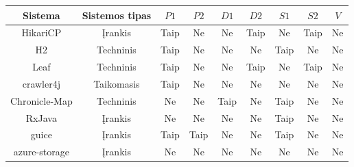 \begin{figure}[H]
    \begin{center}
    \begin{tabular}{|c|c|c|c|c|c|c|c|c|}
        \hline
        Sistema                         & Sistemos tipas & $ P1 $ & $ P2 $ & $ D1 $ & $ D2 $ & $ S1 $ & $ S2 $ & $ V $ \\ \hline\hline
        HikariCP                        & Įrankis                   & Taip                          & Ne                            & Ne                         & Taip                       & Ne                 & Taip               & Ne                  \\ \hline
        H2                              & Techninis                 & Taip                          & Ne                            & Ne                         & Ne                         & Taip               & Ne                 & Ne                  \\ \hline
        Leaf                            & Techninis                 & Taip                          & Ne                            & Ne                         & Taip                       & Ne                 & Taip               & Ne                  \\ \hline
        crawler4j                       & Taikomasis                & Taip                          & Ne                            & Ne                         & Ne                         & Ne                 & Ne                 & Ne                  \\ \hline
        Chronicle-Map                   & Techninis                 & Ne                            & Ne                            & Taip                       & Ne                         & Taip               & Ne                 & Ne                  \\ \hline
        RxJava                          & Įrankis                   & Ne                            & Ne                            & Ne                         & Ne                         & Taip               & Ne                 & Ne                  \\ \hline
        guice                           & Įrankis                   & Taip                          & Taip                          & Ne                         & Ne                         & Taip               & Ne                 & Ne                  \\ \hline
        azure-storage                   & Įrankis                   & Ne                            & Ne                            & Ne                         & Ne                         & Ne                 & Ne                 & Ne                  \\ \hline

\end{tabular}
\end{center}
\end{figure}

